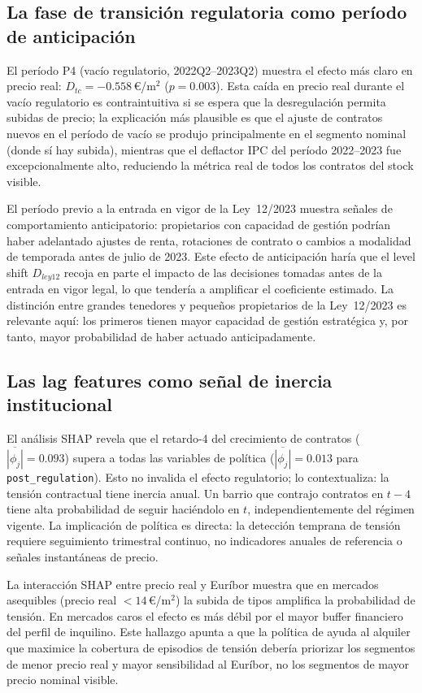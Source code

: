 \documentclass[10pt,a4paper,twocolumn]{article}
\begin{document}
\subsection{La fase de transición regulatoria como período de anticipación}

El período P4 (vacío regulatorio, 2022Q2--2023Q2) muestra el efecto más claro en
precio real: $D_{tc}{=}{-}0.558$\,\euro/m$^2$ ($p{=}0.003$). Esta caída en precio
real durante el vacío regulatorio es contraintuitiva si se espera que la
desregulación permita subidas de precio; la explicación más plausible es que el
ajuste de contratos nuevos en el período de vacío se produjo principalmente en el
segmento nominal (donde sí hay subida), mientras que el deflactor IPC del período
2022--2023 fue excepcionalmente alto, reduciendo la métrica real de todos los
contratos del stock visible.

El período previo a la entrada en vigor de la Ley~12/2023 muestra señales de
comportamiento anticipatorio: propietarios con capacidad de gestión podrían haber
adelantado ajustes de renta, rotaciones de contrato o cambios a modalidad de
temporada antes de julio de 2023. Este efecto de anticipación haría que el level
shift $D_{ley12}$ recoja en parte el impacto de las decisiones tomadas antes de
la entrada en vigor legal, lo que tendería a amplificar el coeficiente estimado.
La distinción entre grandes tenedores y pequeños propietarios de la Ley~12/2023
es relevante aquí: los primeros tienen mayor capacidad de gestión estratégica y,
por tanto, mayor probabilidad de haber actuado anticipadamente.

\subsection{Las lag features como señal de inercia institucional}

El análisis SHAP revela que el retardo-4 del crecimiento de contratos
($\overline{|\phi_j|}{=}0.093$) supera a todas las variables de política
($\overline{|\phi_j|}{=}0.013$ para \texttt{post\_regulation}). Esto no invalida
el efecto regulatorio; lo contextualiza: la tensión contractual tiene inercia anual.
Un barrio que contrajo contratos en $t{-}4$ tiene alta probabilidad de seguir
haciéndolo en $t$, independientemente del régimen vigente. La implicación de
política es directa: la detección temprana de tensión requiere seguimiento
trimestral continuo, no indicadores anuales de referencia o señales instantáneas
de precio.

La interacción SHAP entre precio real y Euríbor muestra que en mercados asequibles
(precio real $< 14$\,\euro/m$^2$) la subida de tipos amplifica la probabilidad
de tensión. En mercados caros el efecto es más débil por el mayor buffer financiero
del perfil de inquilino. Este hallazgo apunta a que la política de ayuda al alquiler
que maximice la cobertura de episodios de tensión debería priorizar los segmentos
de menor precio real y mayor sensibilidad al Euríbor, no los segmentos de mayor
precio nominal visible.
\end{document}
